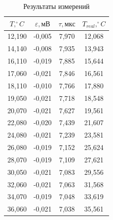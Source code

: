 \documentclass[a4paper, fontsize = 14pt]{article}
\begin{document}
\begin{table}[hbt]
\centering
\begin{tabular}{|c|c|c|c|}
\hline
\textbf{$T,   ^\circ C$} & \textbf{$\varepsilon, мВ$} & \textbf{$\tau, мкс$} & \textbf{$T_{real}, ^\circ C$} \\ \hline
12,190                   & -0,005                     & 7,970                & 12,068                        \\ \hline
14,140                   & -0,008                     & 7,935                & 13,943                        \\ \hline
16,110                   & -0,019                     & 7,885                & 15,644                        \\ \hline
17,060                   & -0,021                     & 7,846                & 16,561                        \\ \hline
18,110                   & -0,010                     & 7,766                & 17,880                        \\ \hline
19,050                   & -0,021                     & 7,718                & 18,548                        \\ \hline
20,070                   & -0,021                     & 7,627                & 19,561                        \\ \hline
22,080                   & -0,020                     & 7,439                & 21,607                        \\ \hline
24,080                   & -0,021                     & 7,239                & 23,581                        \\ \hline
26,080                   & -0,019                     & 7,152                & 25,624                        \\ \hline
28,070                   & -0,019                     & 7,109                & 27,621                        \\ \hline
30,050                   & -0,021                     & 7,083                & 29,556                        \\ \hline
32,060                   & -0,021                     & 7,063                & 31,568                        \\ \hline
34,070                   & -0,019                     & 7,048                & 33,619                        \\ \hline
36,060                   & -0,021                     & 7,038                & 35,561                        \\ \hline
\end{tabular}
\caption{Результаты измерений}
\end{table}
\end{document}
